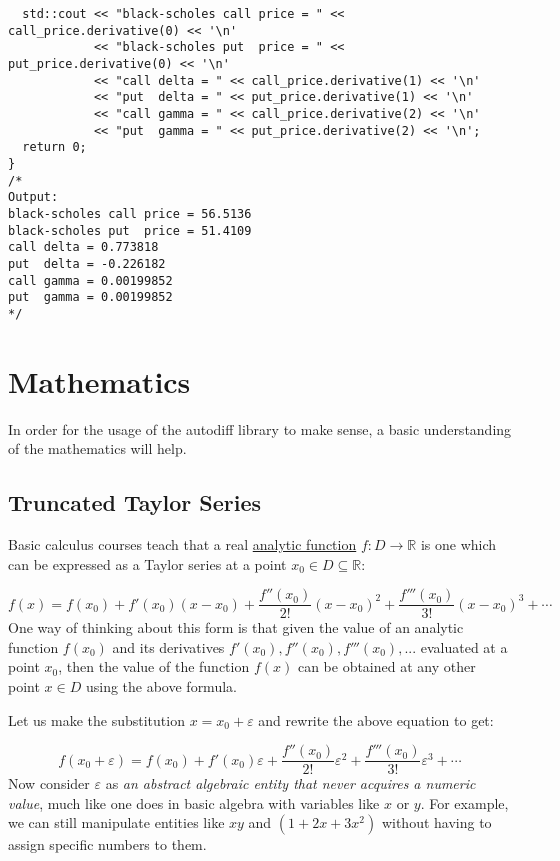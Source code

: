 \documentclass{article}
\begin{document}
\begin{verbatim}
  std::cout << "black-scholes call price = " << call_price.derivative(0) << '\n'
            << "black-scholes put  price = " << put_price.derivative(0) << '\n'
            << "call delta = " << call_price.derivative(1) << '\n'
            << "put  delta = " << put_price.derivative(1) << '\n'
            << "call gamma = " << call_price.derivative(2) << '\n'
            << "put  gamma = " << put_price.derivative(2) << '\n';
  return 0;
}
/*
Output:
black-scholes call price = 56.5136
black-scholes put  price = 51.4109
call delta = 0.773818
put  delta = -0.226182
call gamma = 0.00199852
put  gamma = 0.00199852
*/
\end{verbatim}

\section{Mathematics}

In order for the usage of the autodiff library to make sense, a basic understanding of the mathematics will help.

\subsection{Truncated Taylor Series}

Basic calculus courses teach that a real \href{https://en.wikipedia.org/wiki/Analytic_function}{analytic function}
$f : D\rightarrow\mathbb{R}$ is one which can be expressed as a Taylor series at a point
$x_0\in D\subseteq\mathbb{R}$:

\[
f(x) = f(x_0) + f'(x_0)(x-x_0) + \frac{f''(x_0)}{2!}(x-x_0)^2 + \frac{f'''(x_0)}{3!}(x-x_0)^3 + \cdots
\]
One way of thinking about this form is that given the value of an analytic function $f(x_0)$ and its derivatives
$f'(x_0), f''(x_0), f'''(x_0), ...$ evaluated at a point $x_0$, then the value of the function
$f(x)$ can be obtained at any other point $x\in D$ using the above formula.

Let us make the substitution $x=x_0+\varepsilon$ and rewrite the above equation to get:

\[
f(x_0+\varepsilon) = f(x_0) + f'(x_0)\varepsilon + \frac{f''(x_0)}{2!}\varepsilon^2 + \frac{f'''(x_0)}{3!}\varepsilon^3 + \cdots
\]
Now consider $\varepsilon$ as {\it an abstract algebraic entity that never acquires a numeric value}, much like
one does in basic algebra with variables like $x$ or $y$. For example, we can still manipulate entities
like $xy$ and $(1+2x+3x^2)$ without having to assign specific numbers to them.
\end{document}
